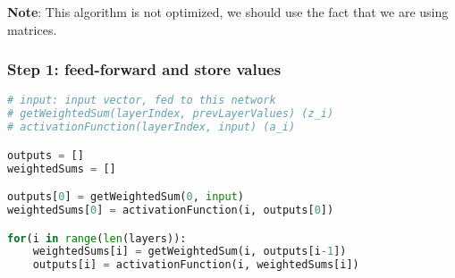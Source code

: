 \documentclass[11pt,a4paper]{report}
\begin{document}
\textbf{Note}: This algorithm is not optimized, we should use the fact that we are using matrices.

\subsubsection{Step 1: feed-forward and store values}

\begin{lstlisting}[language=Python]
# input: input vector, fed to this network
# getWeightedSum(layerIndex, prevLayerValues) (z_i)
# activationFunction(layerIndex, input) (a_i)

outputs = []
weightedSums = []

outputs[0] = getWeightedSum(0, input)
weightedSums[0] = activationFunction(i, outputs[0])

for(i in range(len(layers)):
    weightedSums[i] = getWeightedSum(i, outputs[i-1])
    outputs[i] = activationFunction(i, weightedSums[i])
\end{lstlisting}

\newpage
\end{document}
